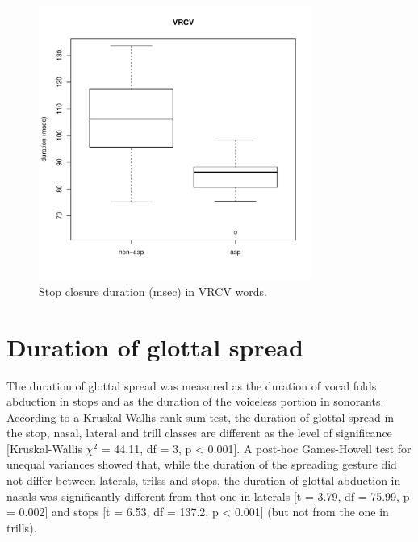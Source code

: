 \documentclass[11pt,a4paper,openany]{memoir}\usepackage[]{graphicx}\usepackage[]{color}
\newenvironment{knitrout}{}{} %
\begin{document}
\begin{figure}
\centering
\begin{knitrout}
\color{fgcolor}
\includegraphics[width=0.8\textwidth]{img/di-rho-clos-box-1} 

\end{knitrout}
\caption{Stop closure duration (msec) in VRCV words.}
\label{f:dirhoclos}
\end{figure}

\section{Duration of glottal spread}
\label{s:gs}


The duration of glottal spread was measured as the duration of vocal folds abduction in stops and as the duration of the voiceless portion in sonorants.
According to a Kruskal-Wallis rank sum test, the duration of glottal spread in the stop, nasal, lateral and trill classes are different as the level of significance [Kruskal-Wallis $\chi^2$ = 44.11, df = 3, p < 0.001].
A post-hoc Games-Howell test for unequal variances showed that, while the duration of the spreading gesture did not differ between laterals, trilss and stops, the duration of glottal abduction in nasals was significantly different from that one in laterals [t = 3.79, df = 75.99, p = 0.002] and stops [t = 6.53, df = 137.2, p < 0.001] (but not from the one in trills).
\end{document}
